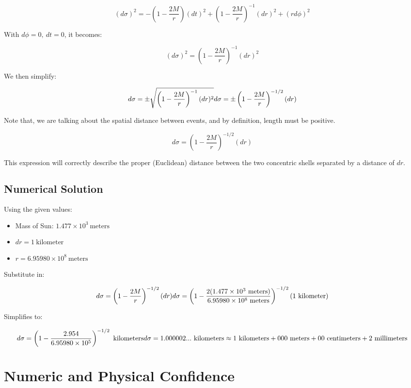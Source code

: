 \documentclass[]{report}
\begin{document}
        $$
        (d\sigma)^2=-\left(1-\frac{2M}{r}\right)(dt)^2+\left(1-\frac{2M}{r}\right)^{-1}(dr)^2+(rd\phi)^2
        $$

        With $d\phi=0,\ dt=0$, it becomes:

        $$
        (d\sigma)^2=\left(1-\frac{2M}{r}\right)^{-1}(dr)^2
        $$

        We then simplify:

        $$
        d\sigma =\pm\sqrt{\left(1-\frac{2M}{r}\right)^{-1}(dr)^2} \\
        d\sigma =\pm\left(1-\frac{2M}{r}\right)^{-1/2}(dr)
        $$

        Note that, we are talking about the spatial distance between events, and by definition, length must be positive.

        $$d\sigma =\left(1-\frac{2M}{r}\right)^{-1/2}(dr)$$

        This expression will correctly describe the proper (Euclidean) distance between the two concentric shells separated by a distance of $dr$.

      \subsection{Numerical Solution}
        Using the given values:

        \begin{itemize}
          \item Mass of Sun: $1.477\times10^3\ \text{meters}$
          \item $dr = 1\ \text{kilometer}$
          \item $r = 6.95980\times10^8\ \text{meters}$
          \end{itemize}

        Substitute in:

        $$d\sigma =\left(1-\frac{2M}{r}\right)^{-1/2}(dr)\\
        d\sigma =\left(1-\frac{2(1.477\times10^3\ \text{meters})}{6.95980\times10^8\ \text{meters}}\right)^{-1/2}(1\ \text{kilometer})
        $$

        Simplifies to:

        $$
        d\sigma =\left(1-\frac{2.954}{6.95980\times10^5}\right)^{-1/2}\ \text{kilometers}\\
        d\sigma = 1.000002...\ \text{kilometers} \approx 1\ \text{kilometers}+000\ \text{meters}+00\ \text{centimeters}+2\ \text{millimeters}
        $$

    \section{Numeric and Physical Confidence}
\end{document}
